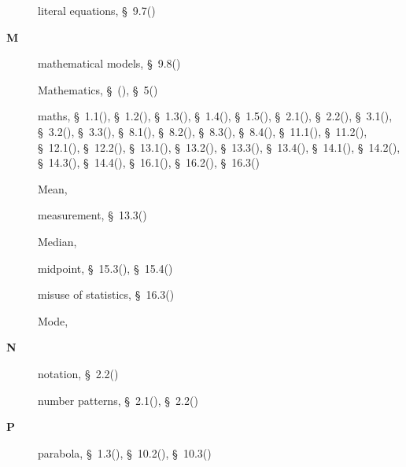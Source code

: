 \begin{multicols}{2}
{\begin{description}
	  \item[] \noindent\raggedright literal equations,  \S~9.7(\pageref{m39258})
	  \vspace{.3cm}
	  \item[{\large \bfseries M}]\noindent\raggedright
	  mathematical models,  \S~9.8(\pageref{m39262})
	  
	  \item[] \noindent\raggedright Mathematics,  \S~(\pageref{m38346}),  \S~5(\pageref{m38359})
	  
	  \item[] \noindent\raggedright maths,  \S~1.1(\pageref{m39337}),  \S~1.2(\pageref{m39338}),  \S~1.3(\pageref{m39345}),  \S~1.4(\pageref{m39341}),  \S~1.5(\pageref{m39348}),  \S~2.1(\pageref{m39364}),  \S~2.2(\pageref{m39362}),  \S~3.1(\pageref{m39332}),  \S~3.2(\pageref{m39334}),  \S~3.3(\pageref{m39335}),  \S~8.1(\pageref{m39383}),  \S~8.2(\pageref{m39387}),  \S~8.3(\pageref{m39394}),  \S~8.4(\pageref{m39392}),  \S~11.1(\pageref{m39377}),  \S~11.2(\pageref{m39373}),  \S~12.1(\pageref{m39370}),  \S~12.2(\pageref{m39368}),  \S~13.1(\pageref{m39354}),  \S~13.2(\pageref{m39352}),  \S~13.3(\pageref{m39357}),  \S~13.4(\pageref{m39358}),  \S~14.1(\pageref{m39405}),  \S~14.2(\pageref{m39408}),  \S~14.3(\pageref{m39411}),  \S~14.4(\pageref{m39414}),  \S~16.1(\pageref{m39403}),  \S~16.2(\pageref{m39400}),  \S~16.3(\pageref{m39404})
	  
	  \item[] \noindent\raggedright Mean,  \pageref{id2621067}
	  
	  \item[] \noindent\raggedright measurement,  \S~13.3(\pageref{m39357})
	  
	  \item[] \noindent\raggedright Median,  \pageref{id2621547}
	  
	  \item[] \noindent\raggedright midpoint,  \S~15.3(\pageref{m39119}),  \S~15.4(\pageref{m39167})
	  
	  \item[] \noindent\raggedright misuse of statistics,  \S~16.3(\pageref{m39404})
	  
	  \item[] \noindent\raggedright Mode,  \pageref{id2622125}
	  \vspace{.3cm}
	  \item[{\large \bfseries N}]\noindent\raggedright
	  notation,  \S~2.2(\pageref{m39362})
	  
	  \item[] \noindent\raggedright number patterns,  \S~2.1(\pageref{m39364}),  \S~2.2(\pageref{m39362})
	  \vspace{.3cm}
	  \item[{\large \bfseries P}]\noindent\raggedright
	  parabola,  \S~1.3(\pageref{m39345}),  \S~10.2(\pageref{m39223}),  \S~10.3(\pageref{m39240})
	  

\end{description}}
\end{multicols}
